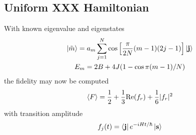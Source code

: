 \documentclass[../../../main.tex]{subfiles}
\begin{document}
\localtableofcontents

\subsection{Uniform XXX Hamiltonian}
With known eigenvalue and eigenstates
\begin{gather*}
  \ket{\tilde{m }} = a_m \sum_{j=1} ^{N} \cos \left[ \frac{\pi }{2N }(m-1 ) (2j-1)\right]  \ket{\mathbf{j}}\\
  E_m = 2B + 4 J (1 - \cos \pi(m-1)/N)
\end{gather*}
the fidelity may now be computed
\begin{equation*}
  \braket{F }  = \frac{1 }{2 } + \frac{1 }{3} \mathrm{Re} (f_r) +\frac{1 }{6 }|f_r|^2
\end{equation*}
with transition amplitude
\begin{equation*}
  f_j(t) = \bra{\mathbf{j}} e ^{-iHt/\hbar }\ket{\mathbf{s}}
\end{equation*}
\end{document}

